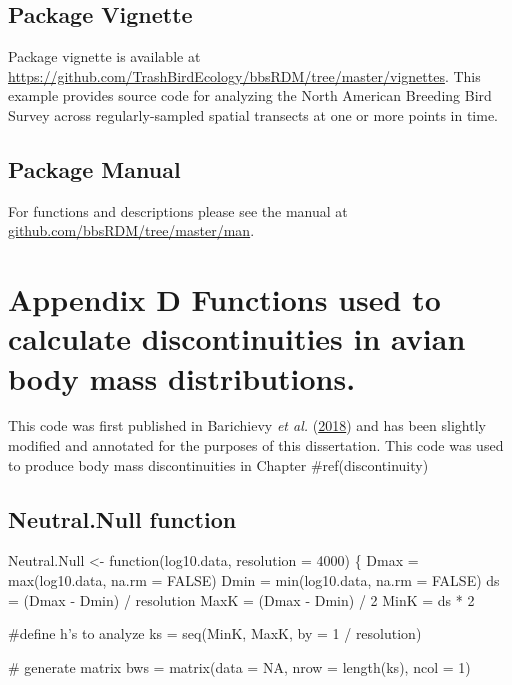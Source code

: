 \documentclass[print]{nuthesis}
\begin{document}
\hypertarget{package-vignette-1}{%
\section{Package Vignette}\label{package-vignette-1}}

Package vignette is available at \url{https://github.com/TrashBirdEcology/bbsRDM/tree/master/vignettes}. This example provides source code for analyzing the North American Breeding Bird Survey across regularly-sampled spatial transects at one or more points in time.

\hypertarget{package-manual-2}{%
\section{Package Manual}\label{package-manual-2}}

For functions and descriptions please see the manual at \href{https://github.com/TrashBirdEcology/bbsRDM/tree/master/man}{github.com/bbsRDM/tree/master/man}.

\appendix

\hypertarget{appDiscont}{%
\chapter*{Appendix D Functions used to calculate discontinuities in avian body mass distributions.}\label{appDiscont}}

This code was first published in Barichievy \emph{et al.} (\protect\hyperlink{ref-barichievy2018method}{2018}) and has been slightly modified and annotated for the purposes of this dissertation. This code was used to produce body mass discontinuities in Chapter \#ref(discontinuity)

\hypertarget{neutral.null-function}{%
\section{Neutral.Null function}\label{neutral.null-function}}

Neutral.Null \textless- function(log10.data, resolution = 4000) \{
Dmax = max(log10.data, na.rm = FALSE)
Dmin = min(log10.data, na.rm = FALSE)
ds = (Dmax - Dmin) / resolution
MaxK = (Dmax - Dmin) / 2
MinK = ds * 2

\#define h's to analyze
ks = seq(MinK, MaxK, by = 1 / resolution)

\# generate matrix
bws = matrix(data = NA,
nrow = length(ks),
ncol = 1)
\end{document}
